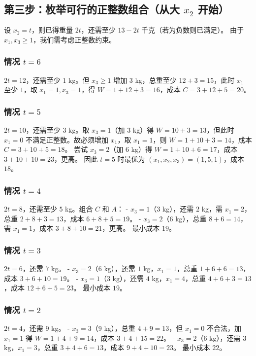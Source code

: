 \subsection*{第三步：枚举可行的正整数组合（从大 \(x_2\) 开始）}
设 \(x_2 = t\)，则已得重量 \(2t\)，还需至少 \(13 - 2t\) 千克（若为负数则已满足）。  
由于 \(x_1, x_3 \geq 1\)，我们需考虑正整数约束。

\subsubsection*{情况 \(t = 6\)}
\(2t = 12\)，还需至少 \(1\) kg。但 \(x_3 \geq 1\) 增加 \(3\) kg，总重至少 \(12+3=15\)，此时 \(x_1\) 至少 \(1\)，取 \(x_1=1, x_3=1\)，得 \(W=1+12+3=16\)，成本 \(C=3+12+5=20\)。

\subsubsection*{情况 \(t = 5\)}
\(2t = 10\)，还需至少 \(3\) kg。取 \(x_3=1\)（加 \(3\) kg）得 \(W=10+3=13\)，但此时 \(x_1=0\) 不满足正整数。故必须增加 \(x_1\)，取 \(x_1=1\)，则 \(W=1+10+3=14\)，成本 \(C=3+10+5=18\)。  
尝试 \(x_3=2\)（加 \(6\) kg）得 \(W=1+10+6=17\)，成本 \(3+10+10=23\)，更高。  
因此 \(t=5\) 时最优为 \((x_1,x_2,x_3)=(1,5,1)\)，成本 \(18\)。

\subsubsection*{情况 \(t = 4\)}
\(2t = 8\)，还需至少 \(5\) kg。组合 \(C\) 和 \(A\)：  
- \(x_3=1\)（3 kg），还需 \(2\) kg，需 \(x_1=2\)，总重 \(2+8+3=13\)，成本 \(6+8+5=19\)。  
- \(x_3=2\)（6 kg），总重 \(8+6=14\)，需 \(x_1=1\)，成本 \(3+8+10=21\)，更高。  
最小成本 \(19\)。

\subsubsection*{情况 \(t = 3\)}
\(2t = 6\)，还需 \(7\) kg。  
- \(x_3=2\)（6 kg），还需 \(1\) kg，\(x_1=1\)，总重 \(1+6+6=13\)，成本 \(3+6+10=19\)。  
- \(x_3=1\)（3 kg），还需 \(4\) kg，\(x_1=4\)，总重 \(4+6+3=13\)，成本 \(12+6+5=23\)。  
最小成本 \(19\)。

\subsubsection*{情况 \(t = 2\)}
\(2t = 4\)，还需 \(9\) kg。  
- \(x_3=3\)（9 kg），总重 \(4+9=13\)，但 \(x_1=0\) 不合法，加 \(x_1=1\) 得 \(W=1+4+9=14\)，成本 \(3+4+15=22\)。  
- \(x_3=2\)（6 kg），还需 \(3\) kg，\(x_1=3\)，总重 \(3+4+6=13\)，成本 \(9+4+10=23\)。  
最小成本 \(22\)。

